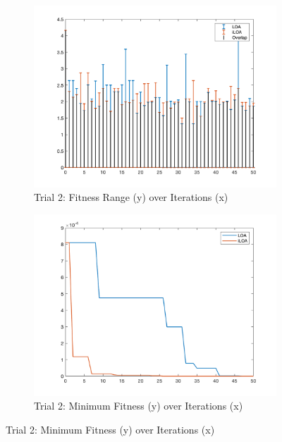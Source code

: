 \begin{figure}
  \begin{subfigure}[b]{0.4\textwidth}
    \includegraphics[width=\textwidth]{img/bars/f1/2}
    \caption{ \scriptsize Trial 2: Fitness Range (y) over Iterations (x)}
    \label{fig:f1-b-2}
  \end{subfigure}
  \begin{subfigure}[b]{0.4\textwidth}
    \includegraphics[width=\textwidth]{img/fits/f1/2}
    \caption{ \scriptsize Trial 2: Minimum Fitness (y) over Iterations (x)}
    \label{fig:f1-f-2}
  \end{subfigure}


\end{figure}
